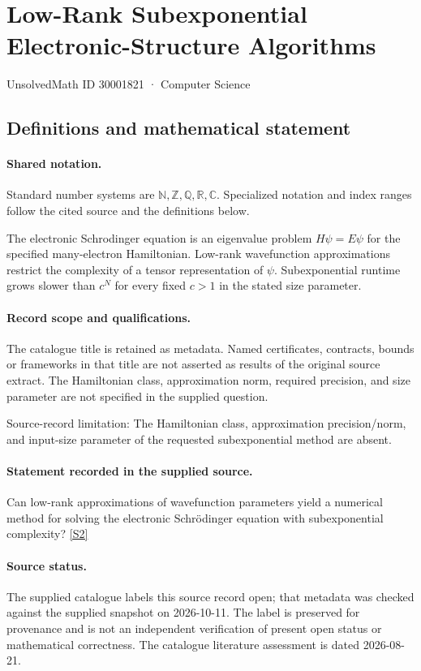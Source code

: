 \documentclass[11pt]{article}
\newcommand{\sref}[2]{\hyperlink{source:#1:#2}{[S#2]}}
\begin{document}
\setcounter{section}{30001820}
\section{Low-Rank Subexponential Electronic-Structure Algorithms}\label{30001821}
{\small\sffamily UnsolvedMath ID 30001821 · Computer Science}
\subsection{Definitions and mathematical statement}

\paragraph{Shared notation.}Standard number systems are $\mathbb N,\mathbb Z,\mathbb Q,\mathbb R,\mathbb C$. Specialized notation and index ranges follow the cited source and the definitions below.


The electronic Schrodinger equation is an eigenvalue problem $H\psi=E\psi$ for the specified many-electron Hamiltonian. Low-rank wavefunction approximations restrict the complexity of a tensor representation of $\psi$. Subexponential runtime grows slower than $c^N$ for every fixed $c>1$ in the stated size parameter.
\paragraph{Record scope and qualifications.}
The catalogue title is retained as metadata. Named certificates, contracts, bounds or frameworks in that title are not asserted as results of the original source extract.
The Hamiltonian class, approximation norm, required precision, and size parameter are not specified in the supplied question.

Source-record limitation: The Hamiltonian class, approximation precision/norm, and input-size parameter of the requested subexponential method are absent.
\paragraph{Statement recorded in the supplied source.}
Can low-rank approximations of wavefunction parameters yield a numerical method for solving the electronic Schrödinger equation with subexponential complexity? \sref{30001821}{2}
\paragraph{Source status.}
The supplied catalogue labels this source record open; that metadata was checked against the supplied snapshot on 2026-10-11. The label is preserved for provenance and is not an independent verification of present open status or mathematical correctness. The catalogue literature assessment is dated 2026-08-21.
\end{document}
